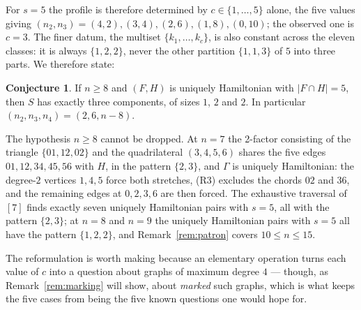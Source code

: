 \documentclass[11pt,a4paper]{article}
\theoremstyle{definition}
\newtheorem{conjecture}[theorem]{Conjecture}
\theoremstyle{remark}
\begin{document}
For $s=5$ the profile is therefore determined by $c\in\{1,\dots,5\}$ alone, the five values giving $(n_2,n_3)=(4,2),(3,4),(2,6),(1,8),(0,10)$; the observed one is $c=3$. The finer datum, the multiset $\{k_1,\dots,k_c\}$, is also constant across the eleven classes: it is always $\{1,2,2\}$, never the other partition $\{1,1,3\}$ of $5$ into three parts. We therefore state:

\begin{conjecture}\label{conj:profile}
If $n\ge8$ and $(F,H)$ is uniquely Hamiltonian with $|F\cap H|=5$, then $S$ has exactly three components, of sizes $1$, $2$ and $2$. In particular $(n_2,n_3,n_4)=(2,6,n-8)$.
\end{conjecture}

The hypothesis $n\ge8$ cannot be dropped. At $n=7$ the 2-factor consisting of the triangle $\{01,12,02\}$ and the quadrilateral $(3,4,5,6)$ shares the five edges $01,12,34,45,56$ with $H$, in the pattern $\{2,3\}$, and $\Gamma$ is uniquely Hamiltonian: the degree-$2$ vertices $1,4,5$ force both stretches, (R3) excludes the chords $02$ and $36$, and the remaining edges at $0,2,3,6$ are then forced. The exhaustive traversal of $[7]$ finds exactly seven uniquely Hamiltonian pairs with $s=5$, all with the pattern $\{2,3\}$; at $n=8$ and $n=9$ the uniquely Hamiltonian pairs with $s=5$ all have the pattern $\{1,2,2\}$, and Remark~\ref{rem:patron} covers $10\le n\le15$.

The reformulation is worth making because an elementary operation turns each value of $c$ into a question about graphs of maximum degree $4$ --- though, as Remark~\ref{rem:marking} will show, about \emph{marked} such graphs, which is what keeps the five cases from being the five known questions one would hope for.
\end{document}
